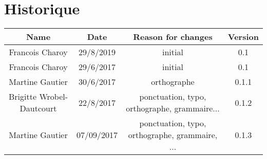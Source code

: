 \chapter*{Historique}

\begin{center}
    \begin{tabular}{|c|c|c|c|}
        \hline
	    Name & Date & Reason for changes & Version\\
        \hline
	    Francois Charoy & 29/8/2019 & initial & 0.1\\
        \hline
	    Francois Charoy & 29/6/2017 & initial & 0.1\\
        \hline
	    Martine Gautier & 30/6/2017 & orthographe & 0.1.1\\
        \hline
        Brigitte Wrobel-Dautcourt & 22/8/2017 & ponctuation, typo, orthographe, grammaire... & 0.1.2\\
        \hline
        Martine Gautier & 07/09/2017 & ponctuation, typo, orthographe, grammaire, ... & 0.1.3\\
        \hline
    \end{tabular}
\end{center}